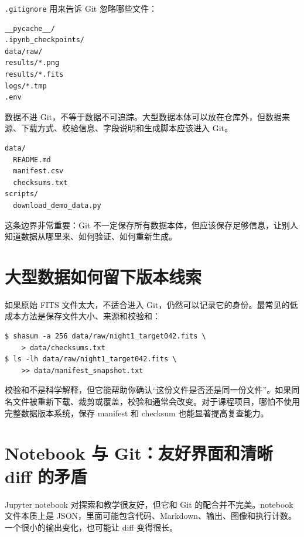 \texttt{.gitignore} 用来告诉 Git 忽略哪些文件：

\begin{examplebox}
\begin{lstlisting}[style=terminal]
__pycache__/
.ipynb_checkpoints/
data/raw/
results/*.png
results/*.fits
logs/*.tmp
.env
\end{lstlisting}
\end{examplebox}

数据不进 Git，不等于数据不可追踪。大型数据本体可以放在仓库外，但数据来源、下载方式、校验信息、字段说明和生成脚本应该进入 Git。

\begin{examplebox}
\begin{lstlisting}[style=terminal]
data/
  README.md
  manifest.csv
  checksums.txt
scripts/
  download_demo_data.py
\end{lstlisting}
\end{examplebox}

这条边界非常重要：Git 不一定保存所有数据本体，但应该保存足够信息，让别人知道数据从哪里来、如何验证、如何重新生成。

\section{大型数据如何留下版本线索}

如果原始 FITS 文件太大，不适合进入 Git，仍然可以记录它的身份。最常见的低成本方法是保存文件大小、来源和校验和：

\begin{examplebox}[生成校验线索]
\begin{lstlisting}[style=terminal]
$ shasum -a 256 data/raw/night1_target042.fits \
    > data/checksums.txt
$ ls -lh data/raw/night1_target042.fits \
    >> data/manifest_snapshot.txt
\end{lstlisting}
\end{examplebox}

校验和不是科学解释，但它能帮助你确认“这份文件是否还是同一份文件”。如果同名文件被重新下载、裁剪或覆盖，校验和通常会改变。对于课程项目，哪怕不使用完整数据版本系统，保存 manifest 和 checksum 也能显著提高复查能力。

\section{Notebook 与 Git：友好界面和清晰 diff 的矛盾}

Jupyter notebook 对探索和教学很友好，但它和 Git 的配合并不完美。notebook 文件本质上是 JSON，里面可能包含代码、Markdown、输出、图像和执行计数。一个很小的输出变化，也可能让 diff 变得很长。

